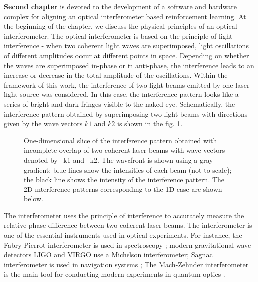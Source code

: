 \underline{\textbf{Second chapter}} is devoted to the development of a software and hardware complex for aligning an optical interferometer based reinforcement learning. At the beginning of the chapter, we discuss the physical principles of an optical interferometer. The optical interferometer is based on the principle of light interference - when two coherent light waves are superimposed, light oscillations of different amplitudes occur at different points in space. Depending on whether the waves are superimposed in-phase or in anti-phase, the interference leads to an increase or decrease in the total amplitude of the oscillations. Within the framework of this work, the interference of two light beams emitted by one laser light source was considered. In this case, the interference pattern looks like a series of bright and dark fringes visible to the naked eye. Schematically, the interference pattern obtained by superimposing two light beams with directions given by the wave vectors $k1$ and $k2$ is shown in the fig. \ref{fig:two_beam_interf}.

\begin{figure}[ht]
    \caption{
    One-dimensional slice of the interference pattern obtained with incomplete overlap of two coherent laser beams with wave vectors denoted by ~k1 and ~k2. The wavefront is shown using a gray gradient; blue lines show the intensities of each beam (not to scale); the black line shows the intensity of the interference pattern. The 2D interference patterns corresponding to the 1D case are shown below.}
\label{fig:two_beam_interf}
\end{figure}

The interferometer uses the principle of interference to accurately measure the relative phase difference between two coherent laser beams. The interferometer is one of the essential instruments used in optical experiments. For instance, the Fabry-Pierrot interferometer is used in spectroscopy \cite{fabry-perot1899}; modern gravitational wave detectors LIGO and VIRGO \cite{LIGO, VIRGO} use a Michelson interferometer; Sagnac interferometer is used in navigation systems \cite{Kandpal2000}; The Mach-Zehnder interferometer is the main tool for conducting modern experiments in quantum optics \cite{Ourjoumtsev2006, Sychev2017}.

